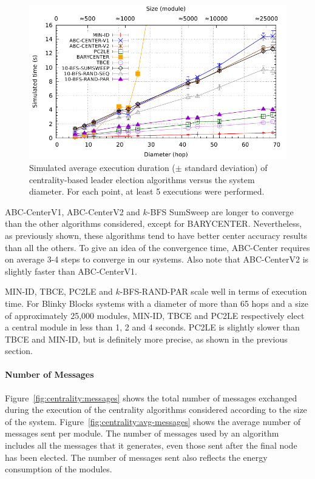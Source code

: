\begin{figure}[!h]
	\centering
	\includegraphics[width=\gnuplotGraphWidth]{images/centrality/time}
	\caption{Simulated average execution duration ($\pm$ standard deviation) of centrality-based leader election algorithms versus the system diameter. For each point, at least 5 executions were performed.\label{fig:centrality:time}}
\end{figure}

ABC-CenterV1, ABC-CenterV2 and $k$-BFS SumSweep are longer to converge than the other algorithms considered, except for BARYCENTER. Nevertheless, as previously shown, these algorithms tend to have better center accuracy results than all the others. To give an idea of the convergence time, ABC-Center requires on average 3-4 steps to converge in our systems. Also note that ABC-CenterV2 is slightly faster than ABC-CenterV1.

MIN-ID, TBCE, PC2LE and $k$-BFS-RAND-PAR scale well in terms of execution time. For Blinky Blocks systems with a diameter of more than 65 hops and a size of approximately 25,000 modules, MIN-ID, TBCE and PC2LE  respectively elect a central module in less than 1, 2 and 4 seconds. PC2LE is slightly slower than TBCE and MIN-ID, but is definitely more precise, as shown in the previous section.

\paragraph{Number of Messages}

Figure~\ref{fig:centrality:messages} shows the total number of messages exchanged during the execution of the centrality algorithms considered according to the size of the system. Figure~\ref{fig:centrality:avg-messages} shows the average number of messages sent per module.
The number of messages used by an algorithm includes all the messages that it generates, even those sent after the final node has been elected. The number of messages sent also reflects the energy consumption of the modules.

